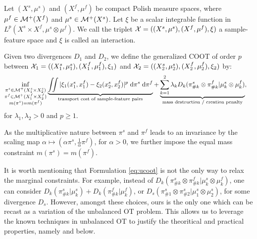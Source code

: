 \begin{definition}
Let $(X^s, \mu^s)$ and $(X^f, \mu^f)$ be compact Polish measure spaces, where $\mu^f \in \mathcal M^+(X^f)$
and $\mu^s \in \mathcal M^+(X^s)$. Let $\xi$ be a scalar integrable function in
$L^p(X^s \times X^f, \mu^s \otimes \mu^f)$. We call the triplet
$\mathcal X = ((X^s, \mu^s), (X^f, \mu^f), \xi)$ a sample-feature space and $\xi$ is called an interaction.
\end{definition}
%
\begin{definition}
\label{def:ucoot}
Given two divergences $D_1$ and $D_2$, we define the generalized COOT of order $p$
between $\mathcal X_1 = ((X_1^s, \mu_1^s), (X_1^f, \mu_1^f), \xi_1)$ and
$\mathcal X_2 = ((X_2^s, \mu_2^s), (X_2^f, \mu_2^f), \xi_2)$ by:
\begin{equation}
\label{eq:ucoot}
  \begin{split}
  \inf_{\substack{\pi^s \in \mathcal M^+(X_1^s \times X_2^s) \\
  \pi^f \in \mathcal M^+(X_1^f \times X_2^f) \\ m(\pi^s) = m(\pi^f)}}
  &\underbrace{\iint |\xi_1(x_1^s, x_1^f) - \xi_2(x_2^s, x_2^f)|^p
  \; \mathrm d\pi^s \; \mathrm d \pi^f}_{\text{transport cost of sample-feature pairs}}
  + \underbrace{\sum_{k=1}^2\lambda_k D_k(\pi^s_{\#k} \otimes \pi^f_{\#k} |
  \mu^s_k \otimes \mu^f_k)}_{\text{mass destruction / creation penalty}},
  \end{split}
\end{equation}
for $\lambda_1, \lambda_2 >0$ and $p \geq 1$.
\end{definition}
As the multiplicative nature between $\pi^s$ and $\pi^f$ leads to an invariance by the scaling map
$\alpha \mapsto (\alpha \pi^s, \frac{1}{\alpha} \pi^f)$, for $\alpha > 0$,
we further impose the equal mass constraint $m(\pi^s) = m(\pi^f)$.

It is worth mentioning that Formulation \eqref{eq:ucoot} is not the only way to
relax the marginal constraints. For example, instead of
$D_k(\pi^s_{\#k} \otimes \pi^f_{\#k} | \mu^s_k \otimes \mu^f_k)$,
one can consider $D_k(\pi^s_{\#k} | \mu^s_k) + D_k( \pi^f_{\#k} | \mu^f_k)$,
or $D_s(\pi^s_{\#1} \otimes \pi^s_{\#2} | \mu^s_1 \otimes \mu^s_2)$,
for some divergence $D_s$. However, amongst these choices,
ours is the only one which can be recast as a variation of the unbalanced OT problem.
This allows us to leverage the known techniques in unbalanced OT to justify
the theoritical and practical properties, namely 
and  below.

